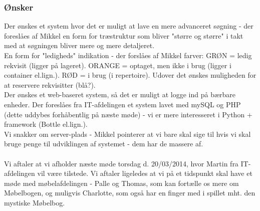 \documentclass[12pt]{article}
\begin{document}
\subsubsection*{Ønsker}
Der ønskes et system hvor det er muligt at lave en mere advanceret søgning - der foreslåes af Mikkel en form for træstruktur som bliver "større og større" i takt med at søgningen bliver mere og mere detaljeret. \\
En form for "ledigheds" indikation - der forslåes af Mikkel farver: GRØN = ledig rekvisit (ligger på lageret). ORANGE = optaget, men ikke i brug (ligger i container el.lign.). RØD = i brug (i repertoire).
Udover det ønskes muligheden for at reservere rekvisitter (blå?).\\
Der ønskes et web-baseret system, så det er muligt at logge ind på bærbare enheder. Der foreslåes fra IT-afdelingen et system lavet med mySQL og PHP (dette uddybes forhåbentlig på næste møde) - vi er mere interesseret i Python + framework (Bottle el.lign.). \\
Vi snakker om server-plads - Mikkel pointerer at vi bare skal sige til hvis vi skal bruge penge til udviklingen af systemet - dem har de massere af. \\\\
Vi aftaler at vi afholder næste møde torsdag d. 20/03/2014, hvor Martin fra IT-afdelingen vil være tilstede. Vi aftaler ligeledes at vi på et tidspunkt skal have et møde med møbelafdelingen - Palle og Thomas, som kan fortælle os mere om Møbelbogen, og muligvis Charlotte, som også har en finger med i spillet mht. den mystiske Møbelbog. 
\end{document}
